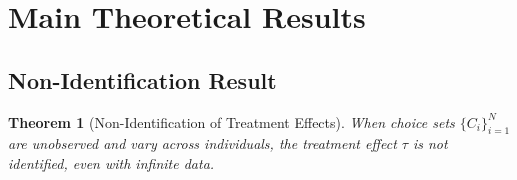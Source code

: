 \documentclass{article}
\newtheorem{theorem}{Theorem}
\begin{document}
\section{Main Theoretical Results}

\subsection{Non-Identification Result}

\begin{theorem}[Non-Identification of Treatment Effects]
\label{thm:nonid}
When choice sets $\{C_i\}_{i=1}^N$ are unobserved and vary across individuals, the treatment effect $\tau$ is not identified, even with infinite data. %
\end{theorem}
\end{document}
